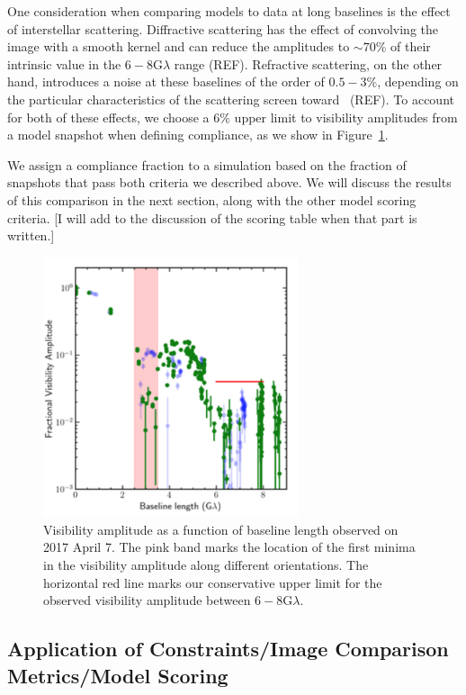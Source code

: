 \documentclass[twocolumn,tighten,dvipsnames,linenumbers]{aastex63}
\begin{document}
One consideration when comparing models to data at long baselines
is the effect of interstellar scattering. Diffractive scattering has
the effect of convolving the image with a smooth kernel and can
reduce the amplitudes to $\sim 70\%$ of their intrinsic value in the
$6-8$\;G$\lambda$ range (REF).  Refractive scattering, on the other
hand, introduces a noise at these baselines of the order of $0.5-3\%$,
depending on the particular characteristics of the scattering screen
toward \sgra\ (REF). To account for both of these effects, we choose a
$6\%$ upper limit to visibility amplitudes from a model snapshot 
when defining compliance, as we show in Figure~\ref{fig:data_comp}.

We assign a compliance fraction to a simulation based on the fraction
of snapshots that pass both criteria we described above. We will
discuss the results of this comparison in the next section, along with 
the other model scoring criteria. [I will add to the discussion of the 
scoring table when that part is written.]

\begin{figure} 
 \centerline{
    \includegraphics[width=7.5cm] {data_3599}}
\caption{\footnotesize Visibility amplitude as a function of baseline length observed on 2017 April 7. The pink band marks the location of the first minima in the visibility amplitude along different orientations. The horizontal red line marks our conservative upper limit for the observed visibility amplitude between $6-8$G$\lambda$.}
\label{fig:data_comp}
\end{figure}

\subsection{Application of Constraints/Image Comparison Metrics/Model Scoring}
\label{sec:apply}
\end{document}
